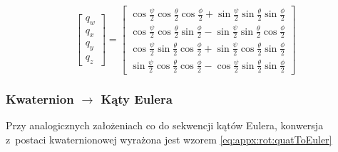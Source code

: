 \begin{equation}
	\label{eq:appx:rot:eulerToQuat}
	\begin{bmatrix}
		q_w \\
		q_x \\
		q_y \\
		q_z 
	\end{bmatrix} 
	= 
	\begin{bmatrix}
		\cos{\frac{\psi}{2}}\cos{\frac{\theta}{2}}\cos{\frac{\phi}{2}}+\sin{\frac{\psi}{2}}\sin{\frac{\theta}{2}}\sin{\frac{\phi}{2}} \\
		\cos{\frac{\psi}{2}}\cos{\frac{\theta}{2}}\sin{\frac{\phi}{2}}-\sin{\frac{\psi}{2}}\sin{\frac{\theta}{2}}\cos{\frac{\phi}{2}} \\
		\cos{\frac{\psi}{2}}\sin{\frac{\theta}{2}}\cos{\frac{\phi}{2}}+\sin{\frac{\psi}{2}}\cos{\frac{\theta}{2}}\sin{\frac{\phi}{2}} \\
		\sin{\frac{\psi}{2}}\cos{\frac{\theta}{2}}\cos{\frac{\phi}{2}}-\cos{\frac{\psi}{2}}\sin{\frac{\theta}{2}}\sin{\frac{\phi}{2}} 
	\end{bmatrix}
\end{equation}
																													
\subsubsection*{Kwaternion $\rightarrow$ Kąty Eulera}
Przy analogicznych założeniach co do sekwencji kątów Eulera, konwersja z~postaci kwaternionowej wyrażona jest wzorem \ref{eq:appx:rot:quatToEuler}
																													

